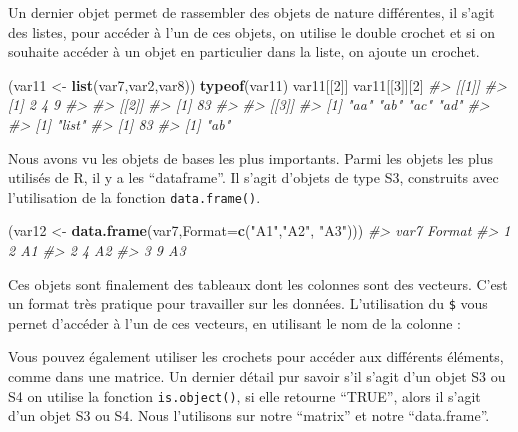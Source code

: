 \documentclass[]{article}
\newenvironment{Shaded}{\begin{snugshade}}{\end{snugshade}}
\newcommand{\CommentTok}[1]{\textcolor[rgb]{0.56,0.35,0.01}{\textit{#1}}}
\newcommand{\DataTypeTok}[1]{\textcolor[rgb]{0.13,0.29,0.53}{#1}}
\newcommand{\DecValTok}[1]{\textcolor[rgb]{0.00,0.00,0.81}{#1}}
\newcommand{\KeywordTok}[1]{\textcolor[rgb]{0.13,0.29,0.53}{\textbf{#1}}}
\newcommand{\NormalTok}[1]{#1}
\newcommand{\OperatorTok}[1]{\textcolor[rgb]{0.81,0.36,0.00}{\textbf{#1}}}
\newcommand{\StringTok}[1]{\textcolor[rgb]{0.31,0.60,0.02}{#1}}
\begin{document}
Un dernier objet permet de rassembler des objets de nature différentes, il s'agit des listes, pour accéder à l'un de ces objets, on utilise le double crochet et si on souhaite accéder à un objet en particulier dans la liste, on ajoute un crochet.

\begin{Shaded}
\begin{Highlighting}[]
\NormalTok{(var11 <-}\StringTok{ }\KeywordTok{list}\NormalTok{(var7,var2,var8))}
\KeywordTok{typeof}\NormalTok{(var11)}
\NormalTok{var11[[}\DecValTok{2}\NormalTok{]]}
\NormalTok{var11[[}\DecValTok{3}\NormalTok{]][}\DecValTok{2}\NormalTok{]}
\CommentTok{#> [[1]]}
\CommentTok{#> [1] 2 4 9}
\CommentTok{#> }
\CommentTok{#> [[2]]}
\CommentTok{#> [1] 83}
\CommentTok{#> }
\CommentTok{#> [[3]]}
\CommentTok{#> [1] "aa" "ab" "ac" "ad"}
\CommentTok{#> }
\CommentTok{#> [1] "list"}
\CommentTok{#> [1] 83}
\CommentTok{#> [1] "ab"}
\end{Highlighting}
\end{Shaded}

Nous avons vu les objets de bases les plus importants. Parmi les objets les plus utilisés de R, il y a les ``dataframe''. Il s'agit d'objets de type S3, construits avec l'utilisation de la fonction \texttt{data.frame()}.

\begin{Shaded}
\begin{Highlighting}[]
\NormalTok{(var12 <-}\StringTok{ }\KeywordTok{data.frame}\NormalTok{(var7,}\DataTypeTok{Format=}\KeywordTok{c}\NormalTok{(}\StringTok{"A1"}\NormalTok{,}\StringTok{"A2"}\NormalTok{,}
  \StringTok{"A3"}\NormalTok{)))}
\CommentTok{#>   var7 Format}
\CommentTok{#> 1    2     A1}
\CommentTok{#> 2    4     A2}
\CommentTok{#> 3    9     A3}
\end{Highlighting}
\end{Shaded}

Ces objets sont finalement des tableaux dont les colonnes sont des vecteurs. C'est un format très pratique pour travailler sur les données. L'utilisation du \texttt{\$} vous pernet d'accéder à l'un de ces vecteurs, en utilisant le nom de la colonne :

\begin{Shaded}
\end{Shaded}

Vous pouvez également utiliser les crochets pour accéder aux différents éléments, comme dans une matrice. Un dernier détail pur savoir s'il s'agit d'un objet S3 ou S4 on utilise la fonction \texttt{is.object()}, si elle retourne ``TRUE'', alors il s'agit d'un objet S3 ou S4. Nous l'utilisons sur notre ``matrix'' et notre ``data.frame''.
\end{document}

